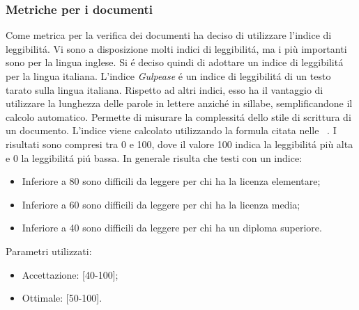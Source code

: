 \subsubsection{Metriche per i documenti}
Come metrica per la verifica dei documenti \gruppo{} ha deciso di utilizzare l’indice di leggibilit\'a.
Vi sono a disposizione molti indici di leggibilit\'a, ma i più importanti sono per la lingua inglese. Si \'e deciso quindi di adottare un indice di leggibilit\'a per la lingua italiana.
L’indice \textit{Gulpease} \'e un indice di leggibilit\'a di un testo tarato sulla lingua italiana. Rispetto ad altri indici, esso ha il vantaggio di utilizzare la lunghezza delle parole in lettere anzich\'e in sillabe, semplificandone il calcolo automatico. Permette di misurare la complessit\'a dello stile di scrittura di un documento.
L’indice viene calcolato utilizzando la formula citata nelle \infoNDP~.
I risultati sono compresi tra 0 e 100, dove il valore 100 indica la leggibilit\'a più alta e 0 la leggibilit\'a pi\'u bassa. In generale risulta che testi con un indice:
\begin{itemize}
\item Inferiore a 80 sono difficili da leggere per chi ha la licenza elementare;
\item Inferiore a 60 sono difficili da leggere per chi ha la licenza media;
\item Inferiore a 40 sono difficili da leggere per chi ha un diploma superiore.
\end{itemize}
Parametri utilizzati:
\begin{itemize}
\item Accettazione: [40-100];
\item Ottimale: [50-100].
\end{itemize}